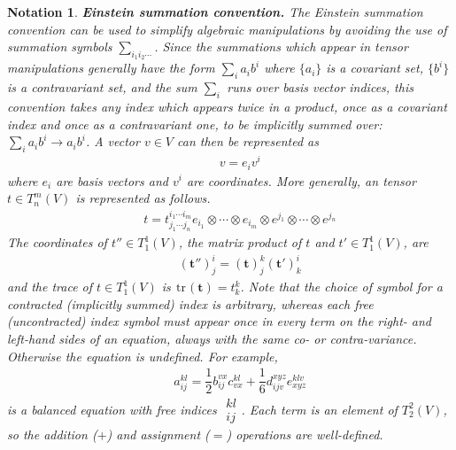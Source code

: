 \documentclass[11pt,fleqn]{article}
\newcommand{\tr}{\ensuremath{\hspace{1pt}\mathrm{tr}\hspace{1pt}}}
\newcommand{\cd}{\ensuremath{\cdots}}
\newcommand{\bmit}[1]{{\bfseries\itshape\mathversion{bold}#1}}
\newcommand{\bo}[1]{\ensuremath{\mathbf{#1}}}
\newcommand{\fr}[2]{\ensuremath{\dfrac{#1}{#2}}}
\newcommand{\miniar}[1]{\ensuremath{\begin{smallmatrix}#1\end{smallmatrix}}}
\theoremstyle{mystyle}
\newtheorem{ntt}{Notation}
\numberwithin{equation}{section}
\begin{document}
\begin{ntt}
\bmit{Einstein summation convention.}
The \textit{Einstein summation convention} can be used to simplify algebraic manipulations by avoiding the use of summation symbols $\sum_{i_1i_2\cd }$.
Since the summations which appear in tensor manipulations generally have the form $\sum_i a_ib^i$ where $\{a_i\}$ is a covariant set, $\{b^i\}$ is a contravariant set, and the sum $\sum_i$ runs over basis vector indices, this convention takes any index which appears twice in a product, once as a covariant index and once as a contravariant one, to be implicitly summed over: $\sum_i a_ib^i\rightarrow a_ib^i$.
A vector $v\in V$ can then be represented as
\begin{align*}
&&
  v
=
  e_iv^i
\end{align*}
where $e_i$ are basis vectors and $v^i$ are coordinates.
More generally, an tensor $t\in T_n^m(V)$ is represented as follows.
\begin{align*}
&&
  t
=
  t^{i_1\cd i_m}_{j_1\cd j_n}
  e_{i_1}\otimes\cd\otimes e_{i_m}\otimes
  e^{j_1}\otimes\cd\otimes e^{j_n}
\end{align*}
The coordinates of $t''\in T_1^1(V)$, the matrix product of $t$ and $t'\in T_1^1(V)$, are
\begin{align*}
&&
  (\bo{t}'')_j^i
=
  (\bo{t})_j^k
  (\bo{t}')_k^i
\end{align*}
and the trace of $t\in T_1^1(V)$ is $\tr(\bo{t})=t_k^k$.
Note that the choice of symbol for a \textit{contracted} (implicitly summed) \textit{index} is arbitrary, whereas each \textit{free} (uncontracted) \textit{index} symbol must appear once in every term on the right- and left-hand sides of an equation, always with the same co- or contra-variance.
Otherwise the equation is undefined.
For example,
\begin{align*}
&&
  a_{ij}^{kl}
=
  \fr{1}{2}
  b_{ij}^{vx}c_{vx}^{kl}
+
  \fr{1}{6}
  d_{ijv}^{xyz}e_{xyz}^{klv}
\end{align*}
is a balanced equation with free indices $\miniar{kl\\ij}$.
Each term is an element of $T_2^2(V)$, so the addition ($+$) and assignment ($=$) operations are well-defined.
\end{ntt}
\end{document}
